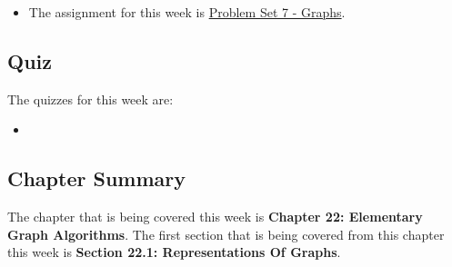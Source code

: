 \begin{itemize}
    \item The assignment for this week is \href{https://github.com/QuantumCompiler/CU/tree/main/CSPB%203104%20-%20Algorithms/CSPB%203104%20-%20Assignments/CSPB%203104%20-%20Problem%20Sets/CSPB%203104%20-%20Problem%20Set%207%20-%20Graphs}{Problem Set 7 - Graphs}. 
\end{itemize}

\subsection{Quiz}

The quizzes for this week are:

\begin{itemize}
    \item {} \textbullet {} 
\end{itemize}

\subsection{Chapter Summary}

The chapter that is being covered this week is \textbf{Chapter 22: Elementary Graph Algorithms}. The first section that is being covered from this chapter this week is \textbf{Section 22.1: Representations Of Graphs}.

